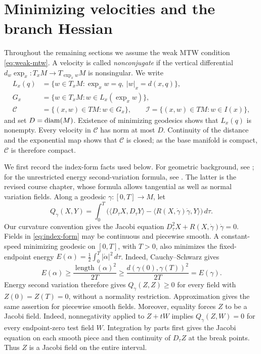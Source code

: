 \section{Minimizing velocities and the branch Hessian}
\label{sec:preliminaries}

Throughout the remaining sections we assume the weak MTW condition
\eqref{eq:weak-mtw}. A velocity is called \emph{nonconjugate} if the
vertical differential $d_w\exp_x:T_xM\to T_{\exp_x w}M$ is nonsingular.
We write
\begin{align*}
 L_x(q)&=\{w\in T_xM:\exp_x w=q,\ |w|_x=d(x,q)\},\\
 G_x&=\{w\in T_xM:w\in L_x(\exp_x w)\},\\
 \mathcal C&=\{(x,w)\in TM:w\in G_x\},
 \qquad
 \mathcal I=\{(x,w)\in TM:w\in I(x)\},
\end{align*}
and set $D=\operatorname{diam}(M)$.  Existence of minimizing geodesics shows that
$L_x(q)$ is nonempty.  Every velocity in $\mathcal C$ has norm at most
$D$.  Continuity of the distance and the exponential map shows that
$\mathcal C$ is closed; as the base manifold is compact, $\mathcal C$ is
therefore compact.

We first record the index-form facts used below. For geometric background,
see \cite[Sections~5.7--5.8]{Calegari2013}; for the unrestricted energy
second-variation formula, see \cite[Proposition~5.3.8]{Gorodski2016}.
The latter is the revised course chapter, whose formula allows tangential
as well as normal variation fields. Along a geodesic
$\gamma:[0,T]\to M$, let
\begin{equation}
 Q_\gamma(X,Y)=\int_0^T
 \bigl(\langle D_\tau X,D_\tau Y\rangle
       -\langle R(X,\dot\gamma)\dot\gamma,Y\rangle\bigr)\,d\tau .
 \label{eq:index-form}
\end{equation}
Our curvature convention gives the Jacobi equation
$D_\tau^2X+R(X,\dot\gamma)\dot\gamma=0$.
Fields in \eqref{eq:index-form} may be continuous and piecewise smooth.
A constant-speed minimizing geodesic on $[0,T]$, with $T>0$, also
minimizes the fixed-endpoint energy
$E(\alpha)=\tfrac12\int_0^T|\dot\alpha|^2\,d\tau$.  Indeed,
Cauchy--Schwarz gives
\[
 E(\alpha)\geq\frac{\operatorname{length}(\alpha)^2}{2T}
 \geq\frac{d(\gamma(0),\gamma(T))^2}{2T}=E(\gamma).
\]
Energy second variation therefore gives $Q_\gamma(Z,Z)\geq0$ for every
field with $Z(0)=Z(T)=0$, without a normality restriction.
Approximation gives the same assertion for piecewise smooth fields.  Moreover, equality forces
$Z$ to be a Jacobi field.  Indeed, nonnegativity applied to $Z+tW$
implies $Q_\gamma(Z,W)=0$ for every endpoint-zero test field $W$.
Integration by parts first gives the Jacobi equation on each smooth
piece and then continuity of $D_\tau Z$ at the break points.  Thus $Z$
is a Jacobi field on the entire interval.

